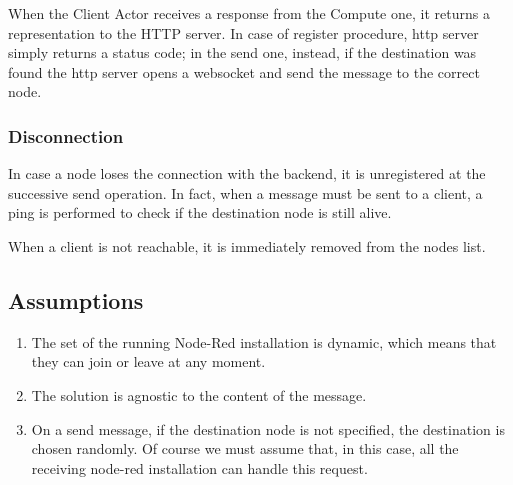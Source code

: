 \documentclass[table, 12pt]{article}
\begin{document}
When the Client Actor receives a response from the Compute one, it returns a representation to the HTTP server. In case of register procedure, http server simply returns a status code; in the send one, instead, if the destination was found the http server opens a websocket and send the message to the correct node.

\subsubsection{Disconnection}
In case a node loses the connection with the backend, it is unregistered at the successive send operation. 
In fact, when a message must be sent to a client, a ping is performed to check if the destination node is still alive.

When a client is not reachable, it is immediately removed from the nodes list.

\subsection{Assumptions}
\begin{enumerate}[label=\textbf{A\arabic*:}]
    \item The set of the running Node-Red installation is dynamic, which means that they can join or leave at any moment.
    \item The solution is agnostic to the content of the message.
    \item On a send message, if the destination node is not specified, the destination is chosen randomly. Of course we must assume that, in this case, all the receiving node-red installation can handle this request.
\end{enumerate}
\end{document}
